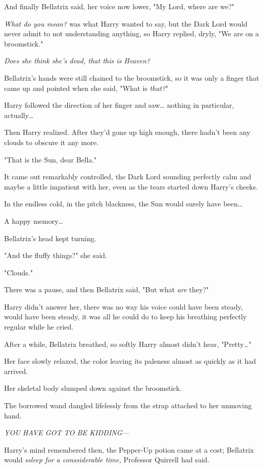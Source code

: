 And finally Bellatrix said, her voice now lower, "My Lord, where are we?"

\emph{What do you mean?} was what Harry wanted to say, but the Dark Lord would 
never admit to not understanding anything, so Harry replied, dryly, "We are on 
a broomstick."

\emph{Does she think she's dead, that this is Heaven?}

Bellatrix's hands were still chained to the broomstick, so it was only a finger 
that came up and pointed when she said, "What is \emph{that?}"

Harry followed the direction of her finger and saw{\ldots} nothing in 
particular, actually{\ldots}

Then Harry realized. After they'd gone up high enough, there hadn't been any 
clouds to obscure it any more.

"That is the Sun, dear Bella."

It came out remarkably controlled, the Dark Lord sounding perfectly calm and 
maybe a little impatient with her, even as the tears started down Harry's 
cheeks.

In the endless cold, in the pitch blackness, the Sun would surely have 
been{\ldots}

A happy memory{\ldots}

Bellatrix's head kept turning.

"And the fluffy things?" she said.

"Clouds."

There was a pause, and then Bellatrix said, "But what \emph{are} they?"

Harry didn't answer her, there was no way his voice could have been steady, 
would have been steady, it was all he could do to keep his breathing perfectly 
regular while he cried.

After a while, Bellatrix breathed, so softly Harry almost didn't hear, 
"Pretty{\ldots}"

Her face slowly relaxed, the color leaving its paleness almost as quickly as it 
had arrived.

Her skeletal body slumped down against the broomstick.

The borrowed wand dangled lifelessly from the strap attached to her unmoving 
hand.

\emph{YOU HAVE GOT TO BE KIDDING---}

Harry's mind remembered then, the Pepper-Up potion came at a cost; Bellatrix 
would \emph{ssleep for a conssiderable time,} Professor Quirrell had said.

